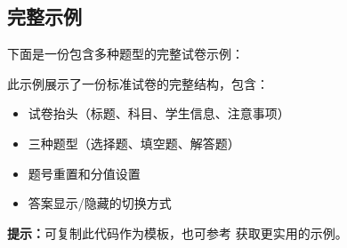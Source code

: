 \subsection{完整示例}

下面是一份包含多种题型的完整试卷示例：

\begin{tcolorbox}[colback=green!5!white, colframe=green!75!black, title=\textbf{完整示例说明}]
此示例展示了一份标准试卷的完整结构，包含：
\begin{itemize}
  \item 试卷抬头（标题、科目、学生信息、注意事项）
  \item 三种题型（选择题、填空题、解答题）
  \item 题号重置和分值设置
  \item 答案显示/隐藏的切换方式
\end{itemize}

\textbf{提示：}可复制此代码作为模板，也可参考  获取更实用的示例。
\end{tcolorbox}

